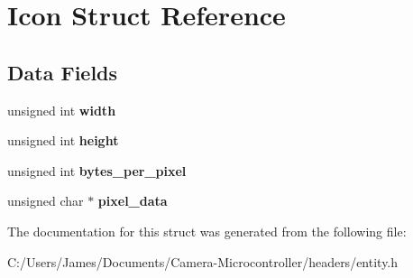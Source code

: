 \hypertarget{struct_icon}{}\section{Icon Struct Reference}
\label{struct_icon}
\subsection*{Data Fields}
\begin{DoxyCompactItemize}
\item 
\mbox{\label{struct_icon_aca34d28e3d8bcbcadb8edb4e3af24f8c}} 
unsigned int {\bfseries width}
\item 
\mbox{\label{struct_icon_ab2e78c61905b4419fcc7b4cfc500fe85}} 
unsigned int {\bfseries height}
\item 
\mbox{\label{struct_icon_a6682c6bd965e44d2880453dd6ea872ce}} 
unsigned int {\bfseries bytes\+\_\+per\+\_\+pixel}
\item 
\mbox{\label{struct_icon_aa8c14727e2624c52d367520497782db8}} 
unsigned char $\ast$ {\bfseries pixel\+\_\+data}
\end{DoxyCompactItemize}


The documentation for this struct was generated from the following file\+:\begin{DoxyCompactItemize}
\item 
C\+:/\+Users/\+James/\+Documents/\+Camera-\/\+Microcontroller/headers/entity.\+h\end{DoxyCompactItemize}
